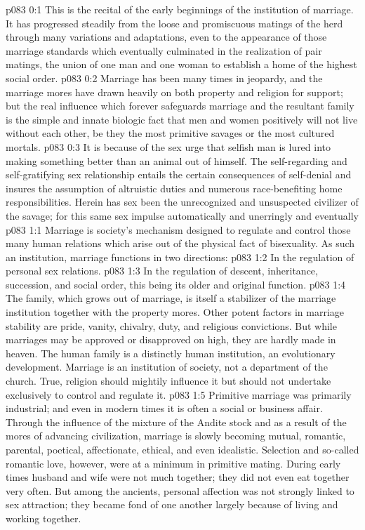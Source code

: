 \author{Chief of Seraphim}
\vs p083 0:1 This is the recital of the early beginnings of the institution of marriage. It has progressed steadily from the loose and promiscuous matings of the herd through many variations and adaptations, even to the appearance of those marriage standards which eventually culminated in the realization of pair matings, the union of one man and one woman to establish a home of the highest social order.
\vs p083 0:2 Marriage has been many times in jeopardy, and the marriage mores have drawn heavily on both property and religion for support; but the real influence which forever safeguards marriage and the resultant family is the simple and innate biologic fact that men and women positively will not live without each other, be they the most primitive savages or the most cultured mortals.
\vs p083 0:3 It is because of the sex urge that selfish man is lured into making something better than an animal out of himself. The self\hyp{}regarding and self\hyp{}gratifying sex relationship entails the certain consequences of self\hyp{}denial and insures the assumption of altruistic duties and numerous race\hyp{}benefiting home responsibilities. Herein has sex been the unrecognized and unsuspected civilizer of the savage; for this same sex impulse automatically and unerringly  and eventually 
\vs p083 1:1 Marriage is society’s mechanism designed to regulate and control those many human relations which arise out of the physical fact of bisexuality. As such an institution, marriage functions in two directions:
\pc \vs p083 1:2 \bibnobreakspace In the regulation of personal sex relations.
\vs p083 1:3 \bibnobreakspace In the regulation of descent, inheritance, succession, and social order, this being its older and original function.
\pc \vs p083 1:4 The family, which grows out of marriage, is itself a stabilizer of the marriage institution together with the property mores. Other potent factors in marriage stability are pride, vanity, chivalry, duty, and religious convictions. But while marriages may be approved or disapproved on high, they are hardly made in heaven. The human family is a distinctly human institution, an evolutionary development. Marriage is an institution of society, not a department of the church. True, religion should mightily influence it but should not undertake exclusively to control and regulate it.
\vs p083 1:5 Primitive marriage was primarily industrial; and even in modern times it is often a social or business affair. Through the influence of the mixture of the Andite stock and as a result of the mores of advancing civilization, marriage is slowly becoming mutual, romantic, parental, poetical, affectionate, ethical, and even idealistic. Selection and so\hyp{}called romantic love, however, were at a minimum in primitive mating. During early times husband and wife were not much together; they did not even eat together very often. But among the ancients, personal affection was not strongly linked to sex attraction; they became fond of one another largely because of living and working together.
